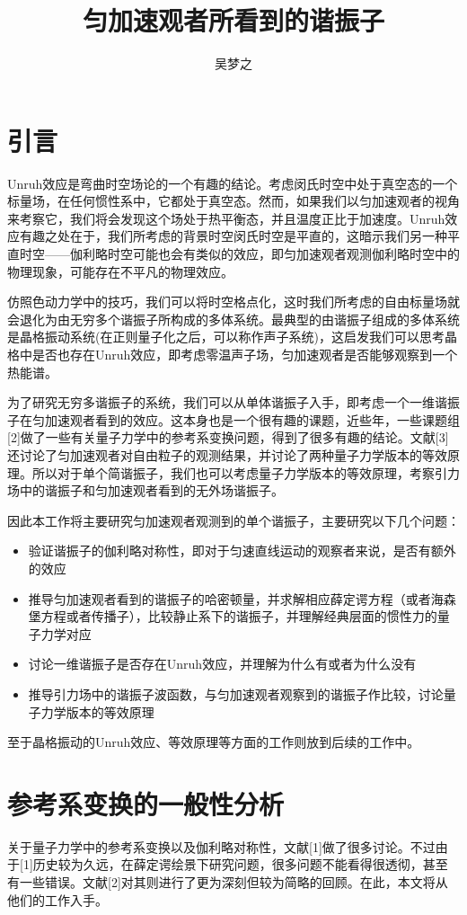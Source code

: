 \documentclass[a4paper]{article}
\title{匀加速观者所看到的谐振子}
\author{吴梦之}
\begin{document}
    \maketitle
    \section{引言}
        Unruh效应是弯曲时空场论的一个有趣的结论。考虑闵氏时空中处于真空态的一个标量场，在任何惯性系中，它都处于真空态。然而，如果我们以匀加速观者的视角来考察它，我们将会发现这个场处于热平衡态，并且温度正比于加速度。Unruh效应有趣之处在于，我们所考虑的背景时空闵氏时空是平直的，这暗示我们另一种平直时空——伽利略时空可能也会有类似的效应，即匀加速观者观测伽利略时空中的物理现象，可能存在不平凡的物理效应。

        仿照色动力学中的技巧，我们可以将时空格点化，这时我们所考虑的自由标量场就会退化为由无穷多个谐振子所构成的多体系统。最典型的由谐振子组成的多体系统是晶格振动系统(在正则量子化之后，可以称作声子系统)，这启发我们可以思考晶格中是否也存在Unruh效应，即考虑零温声子场，匀加速观者是否能够观察到一个热能谱。

        为了研究无穷多谐振子的系统，我们可以从单体谐振子入手，即考虑一个一维谐振子在匀加速观者看到的效应。这本身也是一个很有趣的课题，近些年，一些课题组[2]做了一些有关量子力学中的参考系变换问题，得到了很多有趣的结论。文献[3]还讨论了匀加速观者对自由粒子的观测结果，并讨论了两种量子力学版本的等效原理。所以对于单个简谐振子，我们也可以考虑量子力学版本的等效原理，考察引力场中的谐振子和匀加速观者看到的无外场谐振子。

        因此本工作将主要研究匀加速观者观测到的单个谐振子，主要研究以下几个问题：
        \begin{itemize}
            \item 验证谐振子的伽利略对称性，即对于匀速直线运动的观察者来说，是否有额外的效应
            \item 推导匀加速观者看到的谐振子的哈密顿量，并求解相应薛定谔方程（或者海森堡方程或者传播子），比较静止系下的谐振子，并理解经典层面的惯性力的量子力学对应
            \item 讨论一维谐振子是否存在Unruh效应，并理解为什么有或者为什么没有
            \item 推导引力场中的谐振子波函数，与匀加速观者观察到的谐振子作比较，讨论量子力学版本的等效原理
        \end{itemize}

        至于晶格振动的Unruh效应、等效原理等方面的工作则放到后续的工作中。


    \section{参考系变换的一般性分析}
        关于量子力学中的参考系变换以及伽利略对称性，文献[1]做了很多讨论。不过由于[1]历史较为久远，在薛定谔绘景下研究问题，很多问题不能看得很透彻，甚至有一些错误。文献[2]对其则进行了更为深刻但较为简略的回顾。在此，本文将从他们的工作入手。
        
\end{document}
